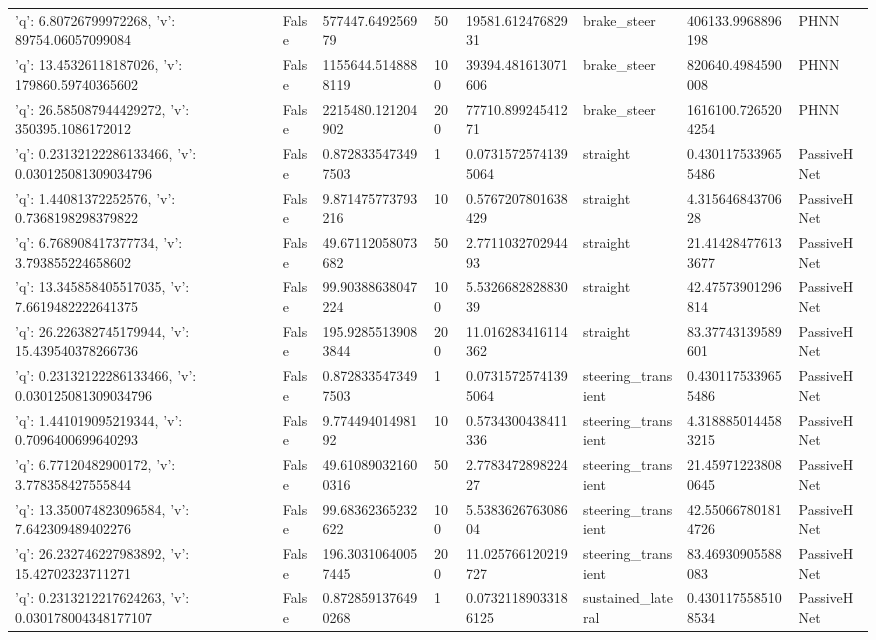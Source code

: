 \begin{tabular}{llllllll}
{'q': 6.80726799972268, 'v': 89754.06057099084} & False & 577447.649256979 & 50 & 19581.61247682931 & brake\_steer & 406133.9968896198 & PHNN \\
{'q': 13.45326118187026, 'v': 179860.59740365602} & False & 1155644.5148888119 & 100 & 39394.481613071606 & brake\_steer & 820640.4984590008 & PHNN \\
{'q': 26.585087944429272, 'v': 350395.1086172012} & False & 2215480.121204902 & 200 & 77710.89924541271 & brake\_steer & 1616100.7265204254 & PHNN \\
{'q': 0.23132122286133466, 'v': 0.030125081309034796} & False & 0.8728335473497503 & 1 & 0.07315725741395064 & straight & 0.4301175339655486 & PassiveHNet \\
{'q': 1.44081372252576, 'v': 0.7368198298379822} & False & 9.871475773793216 & 10 & 0.5767207801638429 & straight & 4.31564684370628 & PassiveHNet \\
{'q': 6.768908417377734, 'v': 3.793855224658602} & False & 49.67112058073682 & 50 & 2.771103270294493 & straight & 21.414284776133677 & PassiveHNet \\
{'q': 13.345858405517035, 'v': 7.6619482222641375} & False & 99.90388638047224 & 100 & 5.532668282883039 & straight & 42.47573901296814 & PassiveHNet \\
{'q': 26.226382745179944, 'v': 15.439540378266736} & False & 195.92855139083844 & 200 & 11.016283416114362 & straight & 83.37743139589601 & PassiveHNet \\
{'q': 0.23132122286133466, 'v': 0.030125081309034796} & False & 0.8728335473497503 & 1 & 0.07315725741395064 & steering\_transient & 0.4301175339655486 & PassiveHNet \\
{'q': 1.441019095219344, 'v': 0.7096400699640293} & False & 9.77449401498192 & 10 & 0.5734300438411336 & steering\_transient & 4.3188850144583215 & PassiveHNet \\
{'q': 6.77120482900172, 'v': 3.778358427555844} & False & 49.610890321600316 & 50 & 2.778347289822427 & steering\_transient & 21.459712238080645 & PassiveHNet \\
{'q': 13.350074823096584, 'v': 7.642309489402276} & False & 99.68362365232622 & 100 & 5.538362676308604 & steering\_transient & 42.550667801814726 & PassiveHNet \\
{'q': 26.232746227983892, 'v': 15.42702323711271} & False & 196.30310640057445 & 200 & 11.025766120219727 & steering\_transient & 83.46930905588083 & PassiveHNet \\
{'q': 0.2313212217624263, 'v': 0.030178004348177107} & False & 0.8728591376490268 & 1 & 0.07321189033186125 & sustained\_lateral & 0.4301175585108534 & PassiveHNet \\

\end{tabular}

